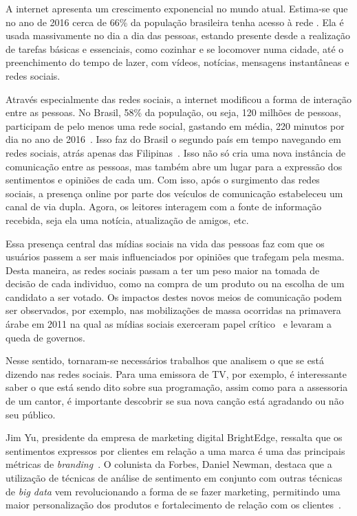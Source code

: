 
A internet apresenta um crescimento exponencial no mundo atual.
Estima-se que no ano de 2016 cerca de 66\% da população brasileira tenha acesso à rede \cite{social17}.
Ela é usada massivamente no dia a dia das pessoas, estando presente desde a realização de tarefas básicas e essenciais,
como cozinhar e se locomover numa cidade, até o preenchimento do tempo de lazer, com vídeos, notícias, mensagens
instantâneas e redes sociais.

Através especialmente das redes sociais, a internet modificou a forma de interação entre as pessoas.
No Brasil, 58\% da população, ou seja, 120 milhões de pessoas, participam de pelo menos uma rede social, gastando em
média, 220 minutos por dia no ano de 2016~\cite{social17}.
Isso faz do Brasil o segundo país em tempo navegando em redes sociais, atrás apenas das Filipinas~\cite{social17}.
Isso não só cria uma nova instância de comunicação entre as pessoas, mas também abre um lugar para a expressão dos
sentimentos e opiniões de cada um.
Com isso, após o surgimento das redes sociais, a presença online por parte dos veículos de comunicação estabeleceu
um canal de via dupla.
Agora, os leitores interagem com a fonte de informação recebida, seja ela uma notícia, atualização de amigos, etc.

Essa presença central das mídias sociais na vida das pessoas faz com que os usuários passem a ser mais influenciados
por opiniões que trafegam pela mesma.
Desta maneira, as redes sociais passam a ter um peso maior na tomada de decisão de cada individuo, como na compra de
um produto ou na escolha de um candidato a ser votado.
Os impactos destes novos meios de comunicação podem ser observados, por exemplo, nas mobilizações de massa ocorridas na
primavera árabe em 2011 na qual as mídias sociais exerceram papel crítico~\cite{mourtada11} e levaram a queda de
governos.

Nesse sentido, tornaram-se necessários trabalhos que analisem o que se está dizendo nas redes sociais.
Para uma emissora de TV, por exemplo, é interessante saber o que está sendo dito sobre sua programação, assim como para
a assessoria de um cantor, é importante descobrir se sua nova canção está agradando ou não seu público.

Jim Yu, presidente da empresa de marketing digital BrightEdge, ressalta que os sentimentos expressos por clientes em
relação a uma marca é uma das principais métricas de \textit{branding}~\cite{marketingland}.
O colunista da Forbes, Daniel Newman, destaca que a utilização de técnicas de análise de sentimento em conjunto com
outras técnicas de \textit{big data} vem revolucionando a forma de se fazer marketing, permitindo uma maior
personalização dos produtos e fortalecimento de relação com os clientes~\cite{newman16}.

